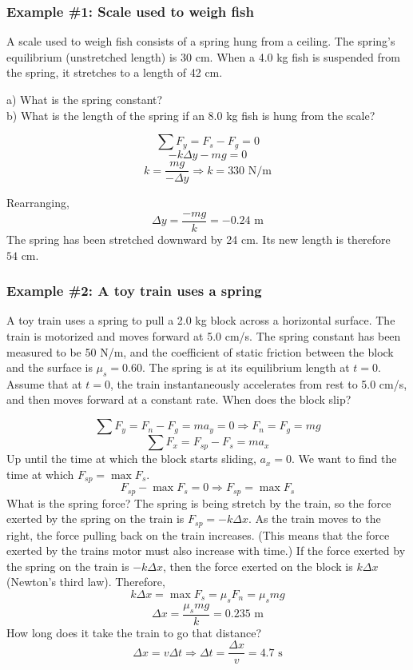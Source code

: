 \subsubsection*{Example \#1: Scale used to weigh fish}
A scale used to weigh fish consists of a spring hung from a ceiling. The spring's equilibrium (unstretched length) is 30 cm. When a 4.0 kg fish is suspended from the spring, it stretches to a length of 42 cm.

a) What is the spring constant?\\
b) What is the length of the spring if an 8.0 kg fish is hung from the scale?


$$\sum F_y=F_s-F_g=0$$
$$-k\Delta{y}-mg=0$$
$$k=\frac{mg}{-\Delta{y}}\Rightarrow \boxed{k=330\mbox{ N/m}}$$

Rearranging,
$$\Delta{y}=\frac{-mg}{k}=-0.24\mbox{ m}$$
The spring has been stretched downward by 24 cm. Its new length is therefore $\boxed{54\mbox{ cm}}$.

\subsubsection*{Example \#2: A toy train uses a spring}
A toy train uses a spring to pull a 2.0 kg block across a horizontal surface. The train is motorized and moves forward at 5.0 cm/s. The spring constant has been measured to be 50 N/m, and the coefficient of static friction between the block and the surface is $\mu_s=0.60$. The spring is at its equilibrium length at $t=0$. Assume that at $t=0$, the train instantaneously accelerates from rest to 5.0 cm/s, and then moves forward at a constant rate. When does the block slip?

\vspace{5cm}

$$\sum F_y = F_n-F_g=ma_y=0 \Rightarrow F_n=F_g=mg$$
$$\sum F_x = F_{sp}-F_s=ma_x$$
Up until the time at which the block starts sliding, $a_x=0$. We want to find the time at which $F_{sp}=\max F_s$.
$$F_{sp}-\max F_s=0\Rightarrow F_{sp}=\max F_s$$
What is the spring force? The spring is being stretch by the train, so the force exerted by the spring on the train is $F_{sp}=-k\Delta{x}$. As the train moves to the right, the force pulling back on the train increases. (This means that the force exerted by the trains motor must also increase with time.) If the force exerted by the spring on the train is $-k\Delta{x}$, then the force exerted on the block is $k\Delta{x}$ (Newton's third law). Therefore,
$$k\Delta{x}=\max F_s=\mu_s F_n=\mu_s mg$$
$$\Delta{x}=\frac{\mu_s mg}{k}=0.235\mbox{ m}$$
How long does it take the train to go that distance?
$$\Delta{x}=v\Delta{t}\Rightarrow \Delta{t}=\frac{\Delta{x}}{v}=4.7\mbox{ s}$$

